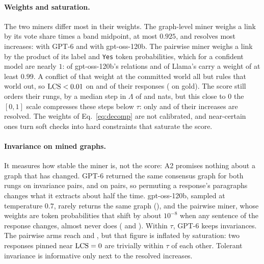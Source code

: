 \paragraph{Weights and saturation.} The two miners differ most in their weights. The graph-level miner weighs a link by its vote share
times a band midpoint, at most $0.925$, and resolves most increases: \sThreeGraphGptLamIncTol{}
with GPT-6 and \sThreeGraphOssLamIncTol{} with gpt-oss-120b. The pairwise miner weighs a link by
the product of its label and \texttt{Yes} token probabilities, which for a confident model are
nearly $1$: \sThreePairOssWHard{} of gpt-oss-120b's relations and \sThreePairLlamaWHard{} of
Llama's carry a weight of at least $0.99$. A conflict of that weight at the committed world all
but rules that world out, so $\mathrm{LCS}<0.01$ on \sThreePairOssSat{} and \sThreePairLlamaSat{} of their
responses (\sThreeGoldSat{} on gold). The score still orders their rungs, by a median step in
$\Lambda$ of \sThreePairOssStep{} and \sThreePairLlamaStep{} nats, but this close to $0$ the
$[0,1]$ scale compresses these steps below $\tau$: only \sThreePairOssLamIncTol{} and \sThreePairLlamaLamIncTol{} of their increases are
resolved. The weights of Eq.~\ref{eq:decomp} are not calibrated, and near-certain ones turn soft
checks into hard constraints that saturate the score.

\paragraph{Invariance on mined graphs.} It measures how stable the miner is, not the score: A2 promises nothing
about a graph that has changed. GPT-6 returned the same consensus graph for both rungs on
\sThreeGraphGptLamInv{} invariance pairs, and on \sThreeGraphGptLamOrder{}  pairs, so
permuting a response's paragraphs changes what it extracts about half the time. gpt-oss-120b,
sampled at temperature $0.7$, rarely returns the same graph (\sThreeGraphOssLamInv), and the pairwise miner, whose weights are token probabilities that shift by about
$10^{-8}$ when any sentence of the response changes, almost never does (\sThreePairOssLamInv{} and
\sThreePairLlamaLamInv). Within $\tau$, GPT-6 keeps \sThreeGraphGptLamInvTol{} invariances. The pairwise arms reach
\sThreePairOssLamInvTol{} and \sThreePairLlamaLamInvTol{}, but that figure is inflated by
saturation: two responses pinned near $\mathrm{LCS}=0$ are trivially within $\tau$ of each other. Tolerant invariance is informative only next to the resolved increases.

